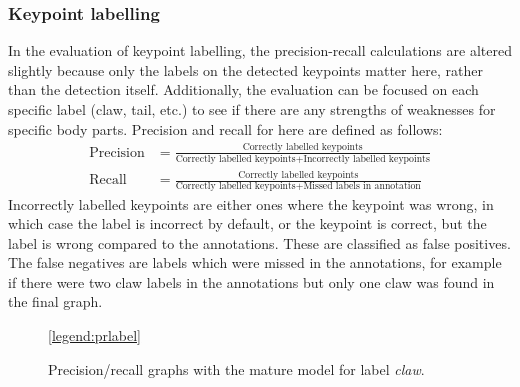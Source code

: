 \subsubsection{Keypoint labelling}
In the evaluation of keypoint labelling, the precision-recall calculations are altered slightly because only the labels on the detected keypoints matter here, rather than the detection itself. Additionally, the evaluation can be focused on each specific label (claw, tail, etc.) to see if there are any strengths of weaknesses for specific body parts. Precision and recall for here are defined as follows:
\begin{align}
\text{Precision} &= \frac{\text{Correctly labelled keypoints}}{\text{Correctly labelled keypoints} + \text{Incorrectly labelled keypoints}}
\\[10pt]
\text{Recall} &= \frac{\text{Correctly labelled keypoints}}{\text{Correctly labelled keypoints} + \text{Missed labels in annotation}}
\end{align}
Incorrectly labelled keypoints are either ones where the keypoint was wrong, in which case the label is incorrect by default, or the keypoint is correct, but the label is wrong compared to the annotations. These are classified as false positives. The false negatives are labels which were missed in the annotations, for example if there were two claw labels in the annotations but only one claw was found in the final graph. 

\begin{figure}[H]
\centering
{}
\ref{legend:prlabel}
\caption{Precision/recall graphs with the mature model for label \textit{claw}.}
\end{figure}

